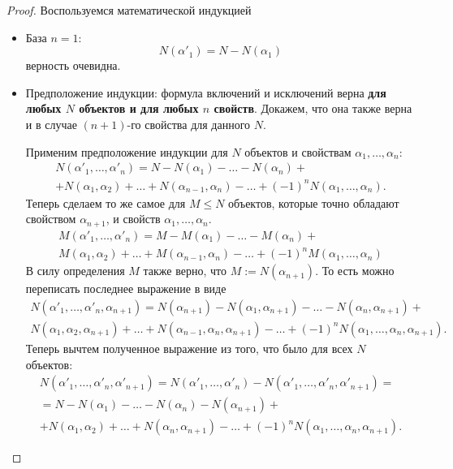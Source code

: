 \begin{multicols}{2}
\begin{proof}
	Воспользуемся математической индукцией
	\begin{itemize}
		\item База $n = 1$:
		\[
			N(\alpha'_1) = N - N(\alpha_1)
		\]
		верность очевидна.
		
		\item Предположение индукции: формула включений и исключений верна \textbf{для любых $N$ объектов и для любых $n$ свойств}. Докажем, что она также верна и в случае $(n + 1)$-го свойства для данного $N$.
		
		Применим предположение индукции для $N$ объектов и свойствам $\alpha_1, \ldots, \alpha_n$:
		\begin{multline*}
			N(\alpha'_1, \ldots, \alpha'_n) = N - N(\alpha_1) - \ldots - N(\alpha_n) + \\ +
			N(\alpha_1, \alpha_2) + \ldots + N(\alpha_{n - 1}, \alpha_n) - \ldots + (-1)^n N(\alpha_1, \ldots, \alpha_n).
		\end{multline*}
		Теперь сделаем то же самое для $M \le N$ объектов, которые точно обладают свойством $\alpha_{n + 1}$, и свойств $\alpha_1, \ldots, \alpha_n$.
		\begin{multline*}
			M(\alpha'_1, \ldots, \alpha'_n) = M - M(\alpha_1) - \ldots - M(\alpha_n) + \\
			M(\alpha_1, \alpha_2) + \ldots + M(\alpha_{n - 1}, \alpha_n) - \ldots + (-1)^n M(\alpha_1, \ldots, \alpha_n)
		\end{multline*}
		В силу определения $M$ также верно, что $M := N(\alpha_{n + 1})$. То есть можно переписать последнее выражение в виде
		\begin{multline*}
			N(\alpha'_1, \ldots, \alpha'_n, \alpha_{n + 1}) = N(\alpha_{n + 1}) - N(\alpha_1, \alpha_{n + 1}) - \ldots - N(\alpha_n, \alpha_{n + 1}) + \\
			N(\alpha_1, \alpha_2, \alpha_{n + 1}) + \ldots + N(\alpha_{n - 1}, \alpha_n, \alpha_{n + 1}) - \ldots + (-1)^n N(\alpha_1, \ldots, \alpha_n, \alpha_{n + 1}).
		\end{multline*}
		Теперь вычтем полученное выражение из того, что было для всех $N$ объектов:
		\begin{multline*}
			N(\alpha'_1, \ldots, \alpha'_n, \alpha'_{n + 1}) = N(\alpha'_1, \ldots, \alpha'_n) - N(\alpha'_1, \ldots, \alpha'_n, \alpha'_{n + 1}) = \\ =
			N - N(\alpha_1) - \ldots - N(\alpha_n) - N(\alpha_{n + 1}) + \\ +
			N(\alpha_1, \alpha_2) + \ldots + N(\alpha_n, \alpha_{n + 1}) - \ldots + (-1)^n N(\alpha_1, \ldots, \alpha_n, \alpha_{n + 1}).
		\end{multline*}
	\end{itemize}
\end{proof}


\end{multicols}
